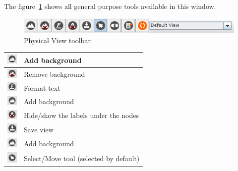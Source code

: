 \documentclass[a4paper]{article}
\begin{document}
		The figure~\ref{fig:default_view_toolbar} shows all general purpose tools available in this window.
		\begin{figure}[h!]
			\centering
			\includegraphics[width=0.6\linewidth]{img/default_view_toolbar.png}
			\caption{Physical View toolbar}
			\label{fig:default_view_toolbar}
		\end{figure}
		
		\begin{table}[h!]
			\centering
			\begin{tabular}[h!]{lp{10cm}}
				\includegraphics[width=0.5cm]{img/icon_add_background.png} & Add background\\
				\midrule
				\includegraphics[width=0.5cm]{img/icon_remove_background.png} & Remove background\\
				\midrule
				\includegraphics[width=0.5cm]{img/icon_format_text.png} & Format text\\
				\midrule
				\includegraphics[width=0.5cm]{img/icon_add_background.png} & Add background\\
				\midrule
				\includegraphics[width=0.5cm]{img/icon_toggle_labels.png} & Hide/show the labels under the nodes\\
				\midrule
				\includegraphics[width=0.5cm]{img/icon_save.png} & Save view\\
				\midrule
				\includegraphics[width=0.5cm]{img/icon_add_background.png} & Add background\\
				\midrule
				\includegraphics[width=0.5cm]{img/icon_select_tool.png} & Select/Move tool (selected by default)\\

\end{tabular}
\end{table}
\end{document}
